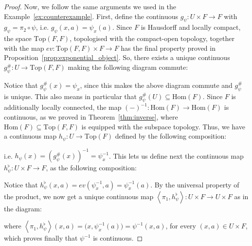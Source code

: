 \begin{proof}
Now, we follow the same arguments we used in the Example~\ref{ex:counterexample}. First, define the continuous $g_{\psi}:U\times F\to F$ with $g_{\psi}=\pi_2\circ\psi$, i.e. $g_{\psi}(x,a)=\psi_x(a)$. Since $F$ is Hausdorff and locally compact, the space $\mathrm{Top}(F,F)$, topologised with the compact-open topology, together with the map $ev:\mathrm{Top}(F,F)\times F\to F$ has the final property proved in Proposition~\ref{prop:exponential_object}. So, there exists a unique continuous $g_{\psi}^{\#}:U\to\mathrm{Top}(F,F)$ making the following diagram commute:
\begin{center}
\end{center}
Notice that $g_{\psi}^{\#}(x)=\psi_x$, since this makes the above diagram commute and $g_{\psi}^{\#}$ is unique. This also means in particular that $g_{\psi}^{\#}(U)\subseteq\mathrm{Hom}(F)$. Since $F$ is additionally locally connected, the map $(-)^{-1}:\mathrm{Hom}(F)\to\mathrm{Hom}(F)$ is continuous, as we proved in Theorem~\ref{thm:inverse}, where $\mathrm{Hom}(F)\subseteq\mathrm{Top}(F,F)$ is equipped with the subspace topology. Thus, we have a continuous map $h_{\psi}:U\to\mathrm{Top}(F)$ defined by the following composition:
\vspace*{-1em}
\begin{center}
\end{center}
i.e. $h_{\psi}(x)=(g_{\psi}^{\#}(x))^{-1}=\psi^{-1}_x$. This lets us define next the continuous map $h_{\psi}^{\flat}:U\times F\to F$, as the following composition:
\begin{center}
\end{center}
Notice that $h_{\psi}^{\flat}(x,a)=ev(\psi^{-1}_x,a)=\psi^{-1}_x(a)$. By the universal property of the product, we now get a unique continuous map $\left<\pi_1,h_{\psi}^{\flat}\right>:U\times F\to U\times F$ as in the diagram:
\begin{center}
\end{center}
where $\left<\pi_1,h_{\psi}^{\flat}\right>(x,a)=\big(x,\psi_x^{-1}(a)\big)=\psi^{-1}(x,a)$, for every $(x,a)\in U\times F$, which proves finally that $\psi^{-1}$ is continuous.
\end{proof}
